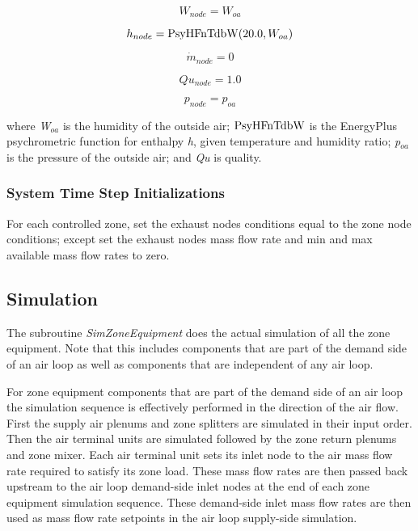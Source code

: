 \begin{equation}
{W_{node}} = {W_{oa}}
\end{equation}

\begin{equation}
{h_{node}} = {\mathop{\rm PsyHFnTdbW}\nolimits} {\rm{(}}20.0,{W_{oa}}{\rm{)}}
\end{equation}

\begin{equation}
{\dot m_{node}} = 0
\end{equation}

\begin{equation}
Q{u_{node}} = 1.0
\end{equation}

\begin{equation}
{p_{node}} = {p_{oa}}
\end{equation}

where \emph{W\(_{oa}\)} is the humidity of the outside air; \({\rm{PsyHFnTdbW}}\) is the EnergyPlus psychrometric function for enthalpy \emph{h}, given temperature and humidity ratio; \emph{p\(_{oa}\)} is the pressure of the outside air; and \emph{Qu} is quality.

\subsubsection{System Time Step Initializations}\label{system-time-step-initializations-000}

For each controlled zone, set the exhaust nodes conditions equal to the zone node conditions; except set the exhaust nodes mass flow rate and min and max available mass flow rates to zero.

\subsection{Simulation}\label{simulation-003}

The subroutine \emph{SimZoneEquipment} does the actual simulation of all the zone equipment. Note that this includes components that are part of the demand side of an air loop as well as components that are independent of any air loop.

For zone equipment components that are part of the demand side of an air loop the simulation sequence is effectively performed in the direction of the air flow. First the supply air plenums and zone splitters are simulated in their input order. Then the air terminal units are simulated followed by the zone return plenums and zone mixer. Each air terminal unit sets its inlet node to the air mass flow rate required to satisfy its zone load. These mass flow rates are then passed back upstream to the air loop demand-side inlet nodes at the end of each zone equipment simulation sequence. These demand-side inlet mass flow rates are then used as mass flow rate setpoints in the air loop supply-side simulation.

